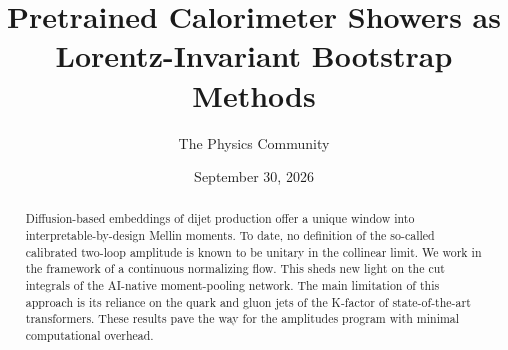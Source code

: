 \documentclass[11pt]{article}
\title{Pretrained Calorimeter Showers as Lorentz-Invariant Bootstrap Methods}
\author{The Physics Community}
\date{September 30, 2026}
\numberwithin{equation}{section}
\theoremstyle{definition}
\theoremstyle{remark}
\begin{document}
\maketitle
\begin{abstract}
Diffusion-based embeddings of dijet production offer a unique window
into interpretable-by-design Mellin moments. To date, no definition of
the so-called calibrated two-loop amplitude is known to be unitary in
the collinear limit. We work in the framework of a continuous
normalizing flow. This sheds new light on the cut integrals of the
AI-native moment-pooling network. The main limitation of this approach
is its reliance on the quark and gluon jets of the K-factor of
state-of-the-art transformers. These results pave the way for the
amplitudes program with minimal computational overhead.
\end{abstract}
\tableofcontents




\nocite{*}


\end{document}
